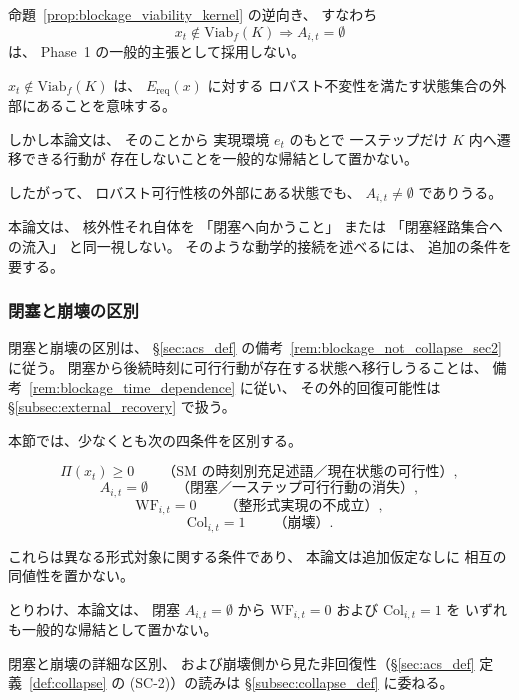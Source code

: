 \begin{remark}[逆方向の非採用]
\label{rem:viability_kernel_not_blockage}
命題~\ref{prop:blockage_viability_kernel} の逆向き、
すなわち
\[
  x_t\notin\mathrm{Viab}_f(K)
  \Longrightarrow
  A_{i,t}=\emptyset
\]
は、
Phase~1 の一般的主張として採用しない。

$x_t\notin\mathrm{Viab}_f(K)$ は、
$E_{\mathrm{req}}(x)$ に対する
ロバスト不変性を満たす状態集合の外部にあることを意味する。

しかし本論文は、
そのことから
実現環境 $e_t$ のもとで
一ステップだけ $K$ 内へ遷移できる行動が
存在しないことを一般的な帰結として置かない。

したがって、
ロバスト可行性核の外部にある状態でも、
$A_{i,t}\neq\emptyset$
でありうる。

本論文は、
核外性それ自体を
「閉塞へ向かうこと」
または
「閉塞経路集合への流入」
と同一視しない。
そのような動学的接続を述べるには、
追加の条件を要する。
\end{remark}

\subsubsection{閉塞と崩壊の区別}

閉塞と崩壊の区別は、
\S\ref{sec:acs_def} の備考~\ref{rem:blockage_not_collapse_sec2} に従う。
閉塞から後続時刻に可行行動が存在する状態へ移行しうることは、
備考~\ref{rem:blockage_time_dependence} に従い、
その外的回復可能性は \S\ref{subsec:external_recovery} で扱う。

\begin{remark}
\label{rem:blockage_fourway_distinction}
本節では、少なくとも次の四条件を区別する。

\[
  \Pi(x_t)\ge0
  \qquad
  \text{（SM の時刻別充足述語／現在状態の可行性）},
\]
\[
  A_{i,t}=\emptyset
  \qquad
  \text{（閉塞／一ステップ可行行動の消失）},
\]
\[
  \mathrm{WF}_{i,t}=0
  \qquad
  \text{（整形式実現の不成立）},
\]
\[
  \mathrm{Col}_{i,t}=1
  \qquad
  \text{（崩壊）}.
\]

これらは異なる形式対象に関する条件であり、
本論文は追加仮定なしに
相互の同値性を置かない。

とりわけ、本論文は、
閉塞 $A_{i,t}=\emptyset$ から
$\mathrm{WF}_{i,t}=0$ および $\mathrm{Col}_{i,t}=1$ を
いずれも一般的な帰結として置かない。

閉塞と崩壊の詳細な区別、
および崩壊側から見た非回復性（\S\ref{sec:acs_def} 定義~\ref{def:collapse} の (SC-2)）の読みは
\S\ref{subsec:collapse_def}
に委ねる。
\end{remark}

